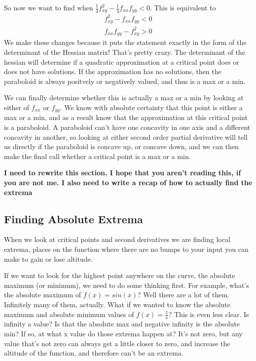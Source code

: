 \documentclass[12pt, letterpaper]{article}
\begin{document}
So now we want to find when $\frac{1}{4}f_{xy}^2 - \frac{1}{4}f_{xx}f_{yy} < 0$. This is equivalent to
\begin{gather*}
    f_{xy}^2 - f_{xx}f_{yy} < 0 \\
    f_{xx}f_{yy} - f_{xy}^2 > 0
\end{gather*}
We make these changes because it puts the statement exactly in the form of the determinant of the Hessian matrix! That's pretty crazy. The determinant of the hessian will determine if a quadratic approximation at a critical point does or does not have solutions. If the approximation has no solutions, then the paraboloid is always positvely or negatively valued, and thus is a max or a min.

We can finally determine whether this is actually a max or a min by looking at either of $f_{xx}$ or $f_{yy}$. We know with absolute certainty that this point is either a max or a min,
and as a result know that the approximation at this critical point is a paraboloid. A paraboloid can't have one concavity in one axis and a different concavity in another,
so looking at either second order partial derivative will tell us directly if the paraboloid is concave up, or concave down, and we can then make the final call whether a critical point is a max or a min.

\textbf{I need to rewrite this section. I hope that you aren't reading this, if you are not me.
I also need to write a recap of how to \textbf{actually find the extrema}}
\subsection{Finding Absolute Extrema}
When we look at critical points and second derivatives we are finding local extrema, places on the function where there are no bumps to your input you can make to gain or lose altitude.

If we want to look for the highest point anywhere on the curve, the absolute maximum (or minimum), we need to do some thinking first.
For example, what's the absolute maximum of $f(x) = sin(x)$? Well there are a lot of them. Infinitely many of them, actually.
What if we wanted to know the absolute maximum and absolute minimum values of $f(x) = \frac{1}{x}$? This is even less clear.
Is infinity a value? Is that the absolute max and negative infinity is the absolute min? If so, at what x value do those extrema happen at?
It's not zero, but any value that's not zero can always get a little closer to zero, and increase the altitude of the function, and therefore can't be an extrema.
\end{document}
